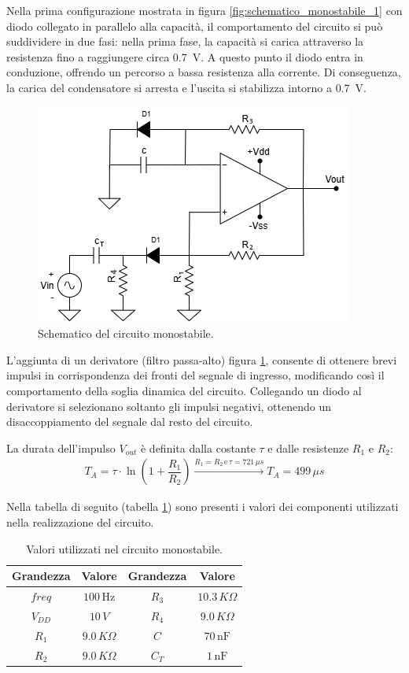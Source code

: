\documentclass[a4paper,12pt]{article}
\begin{document}
Nella prima configurazione mostrata in figura \ref{fig:schematico_monostabile_1} con diodo collegato in parallelo alla capacità, il comportamento del circuito si può suddividere in due fasi: nella prima fase, la capacità si carica attraverso la resistenza fino a raggiungere circa \SI{0.7}{\volt}.
A questo punto il diodo entra in conduzione, offrendo un percorso a bassa resistenza alla corrente.
Di conseguenza, la carica del condensatore si arresta e l’uscita si stabilizza intorno a \SI{0.7}{\volt}.

\begin{figure}[h]
	\centering
	\includegraphics[width=0.6\linewidth]{immagini/monostabile/circuito.png}
	\caption{Schematico del circuito monostabile.}
	\label{fig:schematico_monostabile}
\end{figure}


L’aggiunta di un derivatore (filtro passa-alto) figura \ref{fig:schematico_monostabile}, consente di ottenere brevi impulsi in corrispondenza dei fronti del segnale di ingresso, modificando così il comportamento della soglia dinamica del circuito.
Collegando un diodo al derivatore si selezionano soltanto gli impulsi negativi, ottenendo un disaccoppiamento del segnale dal resto del circuito.

La durata dell'impulso $V_{out}$ è definita dalla costante $\tau$ e dalle resistenze $R_{1}$ e $R_{2}$:
\begin{align*}
	T_{A}=\tau\cdot\ln(1+\dfrac{R_{1}}{R_{2}}) \xrightarrow{R_1 = R_2 \,\text{e}\, \tau = 721\,\mu s } T_A = 499\,\mu s
\end{align*}

\noindent Nella tabella di seguito (tabella \ref{tab:monostabile}) sono presenti i valori dei componenti utilizzati nella realizzazione del circuito.
\begin{table}[h]
	\centering
	\setlength{\tabcolsep}{20pt}
	\begin{tabular}{c c | c c}
		\toprule
		\textbf{Grandezza} & \textbf{Valore}             & \textbf{Grandezza} & \textbf{Valore}            \\
		\midrule
		$freq$   & $100\,\mathrm{Hz}$ & $R_3$    & $10.3\,K\Omega$   \\
		$V_{DD}$ & $10\,V$            & $R_4$    & $9.0\,K\Omega$    \\
		$R_1$    & $9.0\,K\Omega$     & $C$      & $70\,\mathrm{nF}$ \\
		$R_2$    & $9.0\,K\Omega$     & $C_T$    & $1\,\mathrm{nF}$  \\
		\bottomrule
	\end{tabular}
	\caption{Valori utilizzati nel circuito monostabile.}
	\label{tab:monostabile}
\end{table}
\end{document}
